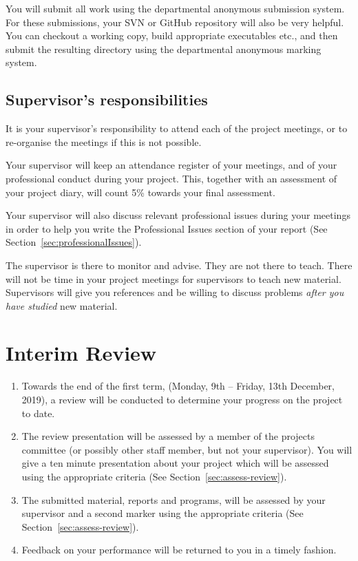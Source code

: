 \documentclass[11pt]{article}
\newcommand{\reviewVivadate}{Monday, 9th -- Friday, 13th December, 2019} %
\newcommand{\supervisorweight}{5\% }
\begin{document}
You will submit all work using the departmental anonymous submission system.  For these submissions, your
 SVN or GitHub repository will also be very helpful. You can checkout a working copy, build appropriate executables etc., and then submit the resulting directory using the departmental anonymous marking system.


\subsection{Supervisor's responsibilities}
It is your supervisor's responsibility to attend each of the project meetings, or to re-organise the meetings if this is not possible.

Your supervisor will keep an attendance register of your meetings, and of your professional conduct during your project.  This, together with an assessment of your project diary, will count \supervisorweight towards your final assessment.

Your supervisor will also discuss relevant professional issues during your meetings in order to help you write the Professional Issues section of your report (See Section~\ref{sec:professionalIssues}).

The supervisor is there to monitor and advise. They are not there to teach. There will not be time in your project meetings for supervisors to teach new material.  Supervisors will give you references and be willing to discuss problems \textit{after you have studied} new material.


\newpage
\section{Interim Review}
\begin{enumerate}
\item Towards the end of the first term, (\reviewVivadate),  a review will be conducted to determine your progress on the project to date.
\item The review presentation will be assessed by a member of the projects committee (or possibly other staff member, but not your supervisor).  You will give a
ten minute presentation about your project which  will be assessed  using the appropriate criteria (See Section~\ref{sec:assess-review}).
\item The submitted material, reports and programs, will be assessed by your supervisor and a second marker using the appropriate criteria (See Section~\ref{sec:assess-review}).
\item
Feedback on your performance will be returned to you in a timely fashion.

\end{enumerate}
\end{document}

